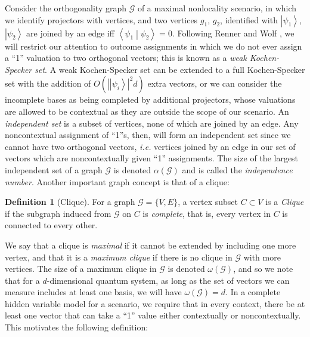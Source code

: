 \documentclass{amsart}
\theoremstyle{definition}
\newtheorem{defn}{Definition}
\newcommand{\ket}[1]{{\left\vert{#1}\right\rangle}}
\newcommand{\braket}[2]{{\left< {#1} \middle\vert {#2}\right>}}
\begin{document}
Consider the orthogonality graph $\mathcal{G}$ of a maximal nonlocality scenario, in which we identify projectors with vertices, and two vertices $g_1$, $g_2$, identified with $\ket{\psi_1}$, $\ket{\psi_2}$ are joined by an edge iff $\braket{\psi_1}{\psi_2}=0$. Following Renner and Wolf \cite{Renn2004}, we will restrict our attention to outcome assignments in which we do not ever assign a ``1'' valuation to two orthogonal vectors; this is known as a \emph{weak Kochen-Specker set}. A weak Kochen-Specker set can be extended to a full Kochen-Specker set with the addition of $O(|\ket{\psi_i}|^2d)$ extra vectors, or we can consider the incomplete bases as being completed by additional projectors, whose valuations are allowed to be contextual as they are outside the scope of our scenario. An \emph{independent set} is a subset of vertices, none of which are joined by an edge. Any noncontextual assignment of ``1''s, then, will form an independent set since we cannot have two orthogonal vectors, \emph{i.e.} vertices joined by an edge in our set of vectors which are noncontextually given ``1'' assignments. The size of the largest independent set of a graph $\mathcal{G}$ is denoted $\alpha(\mathcal{G})$ and is called the \emph{independence number}. Another important graph concept is that of a clique:%

\begin{defn}[Clique]
For a graph $\mathcal{G}=\{V,E\}$, a vertex subset $C\subset V$ is a \emph{Clique} if the subgraph induced from $\mathcal{G}$ on $C$ is \emph{complete}, that is,  every vertex in $C$ is connected to every other.
\end{defn}

We say that a clique is \emph{maximal} if it cannot be extended by including one more vertex, and that it is a \emph{maximum clique} if there is no clique in $\mathcal{G}$ with more vertices. The size of a maximum clique in $\mathcal{G}$ is denoted $\omega(\mathcal{G})$, and so we note that for a $d$-dimensional quantum system, as long as the set of vectors we can measure includes at least one basis, we will have $\omega(\mathcal{G})=d$. In a complete hidden variable model for a scenario, we require that in every context, there be at least one vector that can take a ``1'' value either contextually or noncontextually. This motivates the following definition:
\end{document}

